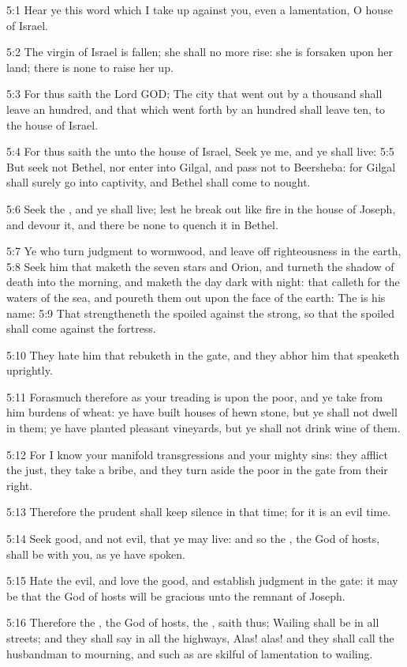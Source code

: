 5:1 Hear ye this word which I take up against you, even a lamentation, O house of Israel.

5:2 The virgin of Israel is fallen; she shall no more rise: she is forsaken upon her land; there is none to raise her up.

5:3 For thus saith the Lord GOD; The city that went out by a thousand shall leave an hundred, and that which went forth by an hundred shall leave ten, to the house of Israel.

5:4 For thus saith the \LORD unto the house of Israel, Seek ye me, and ye shall live: 5:5 But seek not Bethel, nor enter into Gilgal, and pass not to Beersheba: for Gilgal shall surely go into captivity, and Bethel shall come to nought.

5:6 Seek the \LORD, and ye shall live; lest he break out like fire in the house of Joseph, and devour it, and there be none to quench it in Bethel.

5:7 Ye who turn judgment to wormwood, and leave off righteousness in the earth, 5:8 Seek him that maketh the seven stars and Orion, and turneth the shadow of death into the morning, and maketh the day dark with night: that calleth for the waters of the sea, and poureth them out upon the face of the earth: The \LORD is his name: 5:9 That strengtheneth the spoiled against the strong, so that the spoiled shall come against the fortress.

5:10 They hate him that rebuketh in the gate, and they abhor him that speaketh uprightly.

5:11 Forasmuch therefore as your treading is upon the poor, and ye take from him burdens of wheat: ye have built houses of hewn stone, but ye shall not dwell in them; ye have planted pleasant vineyards, but ye shall not drink wine of them.

5:12 For I know your manifold transgressions and your mighty sins: they afflict the just, they take a bribe, and they turn aside the poor in the gate from their right.

5:13 Therefore the prudent shall keep silence in that time; for it is an evil time.

5:14 Seek good, and not evil, that ye may live: and so the \LORD, the God of hosts, shall be with you, as ye have spoken.

5:15 Hate the evil, and love the good, and establish judgment in the gate: it may be that the \LORD God of hosts will be gracious unto the remnant of Joseph.

5:16 Therefore the \LORD, the God of hosts, the \LORD, saith thus; Wailing shall be in all streets; and they shall say in all the highways, Alas! alas!  and they shall call the husbandman to mourning, and such as are skilful of lamentation to wailing.

